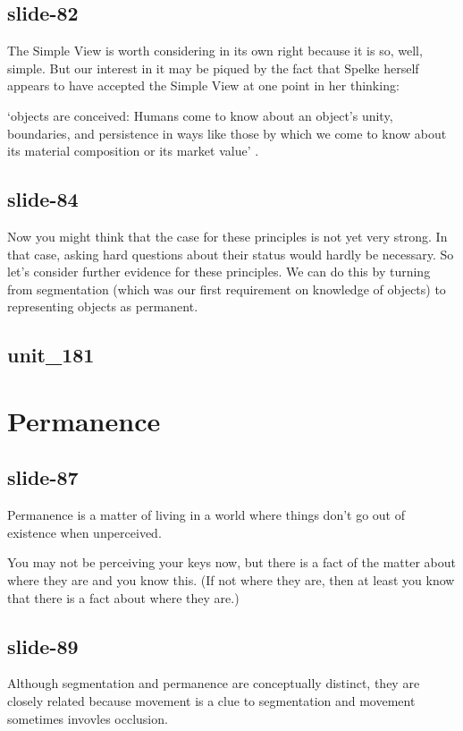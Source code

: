 \documentclass[12pt,\papersize]{extarticle}
\begin{document}
\subsection{slide-82}
The Simple View is worth considering in its own right because it is so, well, simple.
But our interest in it may be piqued by the fact that   
Spelke herself appears to have accepted the Simple View at one point in her thinking:
 
‘objects are conceived: Humans come to know about an object’s unity, boundaries, and 
persistence in ways like those by which we come to know about its material composition or its 
market value’
\citep[p.\ 198]{Spelke:1988xc}.
 
\subsection{slide-84}
Now you might think that the case for these principles is not yet very strong.
In that case, asking hard questions about their status would hardly be necessary.
So let’s consider further evidence for these principles.
We can do this by turning from segmentation (which was our first requirement on knowledge of 
objects) 
to representing objects as permanent.
 
\subsection{unit\_181}
 
 
\section{Permanence}
 
\subsection{slide-87}
Permanence is a matter of living in a world where things don't go out of existence when unperceived.
 
You may not be perceiving your keys now, but there is a fact of the matter about where they are and you know this.  (If not where they are, then at least you know that there is a fact about where they are.)
 
\subsection{slide-89}
Although segmentation and permanence are conceptually distinct, they are closely related 
because movement is a clue to segmentation and movement sometimes invovles occlusion.
 
\end{document}
